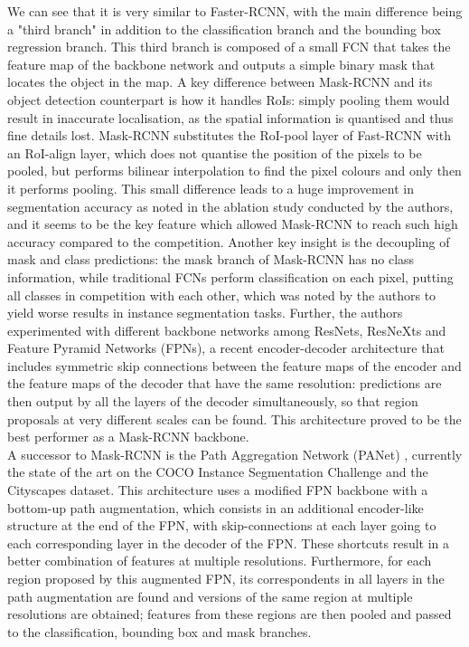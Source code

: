 \documentclass[12pt,twoside]{report}
\begin{document}
We can see that it is very similar to Faster-RCNN, with the main difference being a "third branch" in addition to the classification branch and the bounding box regression branch. This third branch is composed of a small FCN that takes the feature map of the backbone network and outputs a simple binary mask that locates the object in the map. A key difference between Mask-RCNN and its object detection counterpart is how it handles RoIs: simply pooling them would result in inaccurate localisation, as the spatial information is quantised and thus fine details lost. Mask-RCNN substitutes the RoI-pool layer of Fast-RCNN with an RoI-align layer, which does not quantise the position of the pixels to be pooled, but performs bilinear interpolation to find the pixel colours and only then it performs pooling. This small difference leads to a huge improvement in segmentation accuracy as noted in the ablation study conducted by the authors, and it seems to be the key feature which allowed Mask-RCNN to reach such high accuracy compared to the competition. Another key insight is the decoupling of mask and class predictions: the mask branch of Mask-RCNN has no class information, while traditional FCNs perform classification on each pixel, putting all classes in competition with each other, which was noted by the authors to yield worse results in instance segmentation tasks. Further, the authors experimented with different backbone networks among ResNets, ResNeXts and Feature Pyramid Networks (FPNs), a recent encoder-decoder architecture that includes symmetric skip connections between the feature maps of the encoder and the feature maps of the decoder that have the same resolution: predictions are then output by all the layers of the decoder simultaneously, so that region proposals at very different scales can be found. This architecture proved to be the best performer as a Mask-RCNN backbone.
\\

A successor to Mask-RCNN is the Path Aggregation Network (PANet) \cite{panet}, currently the state of the art on the COCO Instance Segmentation Challenge and the Cityscapes dataset. This architecture uses a modified FPN backbone with a bottom-up path augmentation, which consists in an additional encoder-like structure at the end of the FPN, with skip-connections at each layer going to each corresponding layer in the decoder of the FPN. These shortcuts result in a better combination of features at multiple resolutions. Furthermore, for each region proposed by this augmented FPN, its correspondents in all layers in the path augmentation are found and versions of the same region at multiple resolutions are obtained; features from these regions are then pooled and passed to the classification, bounding box and mask branches.
\end{document}
